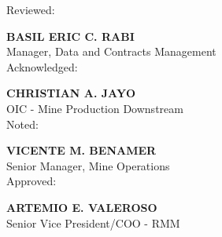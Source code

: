 \documentclass[10pt]{article}
\begin{document}
	\vspace*{.5 in}

	\begin{table}[h!]
		Reviewed:

		\vspace*{.3 in}
		\textbf{BASIL ERIC C. RABI} \\
		Manager, Data and Contracts Management \\

		\vspace*{.2 in}
		Acknowledged:

		\vspace*{.3 in}
		\textbf{CHRISTIAN A. JAYO} \\
		OIC - Mine Production Downstream \\

		\vspace*{.2 in}
		Noted:

		\vspace*{.3 in}
		\textbf{VICENTE M. BENAMER} \\
		Senior Manager, Mine Operations \\

		\vspace*{.2 in}
		Approved:

		\vspace*{.3 in}
		\textbf{ARTEMIO E. VALEROSO} \\
		Senior Vice President/COO - RMM \\



	\end{table}
\end{document}

